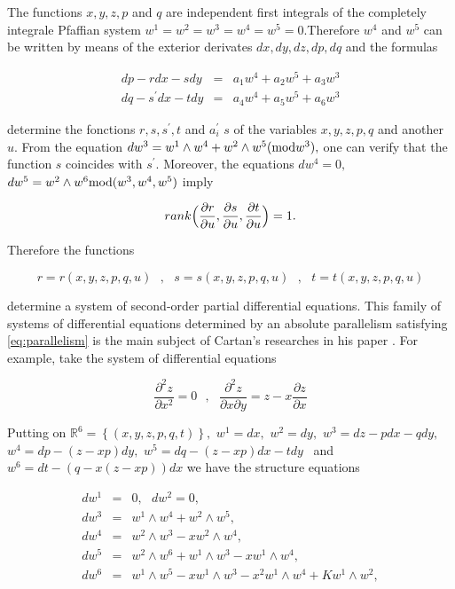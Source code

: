 \documentclass{amsproc}
\theoremstyle{remark}
\numberwithin{equation}{section}
\begin{document}
The functions $x,y,z,p$ and $q$ are independent first integrals of the
completely integrale Pfaffian system $w^{1}=w^{2}=w^{3}=w^{4}=w^{5}=0.$Therefore $w^{4}$ and $w^{5}$ can be written by means of the exterior
derivates $dx,dy,dz,dp,dq$ and the formulas

\begin{eqnarray*}
dp-rdx-sdy &=&a_{1}w^{4}+a_{2}w^{5}+a_{3}w^{3} \\
dq-s^{\prime }dx-tdy &=&a_{4}w^{4}+a_{5}w^{5}+a_{6}w^{3}
\end{eqnarray*}

determine the fonctions $r,s,s^{\prime },t$ and $a_{i}^{\prime }$ $s$ of the
variables $x,y,z,p,q$ and another $u.$ From the equation $dw^{3}=w^{1}\wedge
w^{4}+w^{2}\wedge w^{5}({\mathop{\mbox{\rm {mod}}}}w^{3}),$ one can verify that the function $s$ coincides with $s^{\prime }.$ Moreover, the equations $dw^{4}=0,$ $dw^{5}=w^{2}\wedge w^{6}{\mathop{\mbox{\rm {mod}}}}(w^{3},w^{4},w^{5}) $ imply

\begin{equation*}
rank{\Bigl (}\frac{\partial r}{\partial u},\frac{\partial s}{\partial u},\frac{\partial t}{\partial u}{\Bigr )=1.}
\end{equation*}

Therefore the functions

\begin{equation*}
r=r(x,y,z,p,q,u)\text{ \ },\text{ \ }s=s(x,y,z,p,q,u)\text{ },\text{ }t=t(x,y,z,p,q,u)
\end{equation*}

determine a system of second-order partial differential equations. This
family of systems of differential equations determined by an absolute
parallelism satisfying \eqref{eq:parallelism} is the main subject of Cartan's researches in
his paper \cite{Ca1,Ca2}. For example, take the system of differential
equations

\begin{equation}
 \label{eq:surface}
\frac{\partial ^{2}z}{\partial x^{2}}=0\text{ },\text{ }\frac{\partial ^{2}z}{\partial x\partial y}=z-x\frac{\partial z}{\partial x}
\end{equation}

Putting on $\mathbb{R}
^{6}=\left\{ (x,y,z,p,q,t)\right\} ,$ $w^{1}=dx,$ $w^{2}=dy,$ $w^{3}=dz-pdx-qdy,$ $w^{4}=dp-(z-xp)dy,$ $w^{5}=dq-(z-xp)dx-tdy$ \ and $w^{6}=dt-(q-x(z-xp))dx$ we have the structure equations

\begin{eqnarray*}
dw^{1} &=&0,\text{ }dw^{2}=0, \\
dw^{3} &=&w^{1}\wedge w^{4}+w^{2}\wedge w^{5}, \\
dw^{4} &=&w^{2}\wedge w^{3}-xw^{2}\wedge w^{4}, \\
dw^{5} &=&w^{2}\wedge w^{6}+w^{1}\wedge w^{3}-xw^{1}\wedge w^{4}, \\
dw^{6} &=&w^{1}\wedge w^{5}-xw^{1}\wedge w^{3}-x^{2}w^{1}\wedge
w^{4}+Kw^{1}\wedge w^{2},
\end{eqnarray*}
\end{document}
